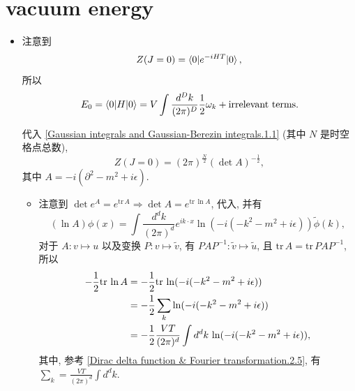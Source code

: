 \section{vacuum energy} \label{free field theory.4}
\begin{itemize}
	\item 注意到
	\begin{equation} \label{free field theory.4.1}
		Z(J = 0) = \braket{0 | e^{- i H T} | 0},
	\end{equation}
	所以
	\begin{equation}
		E_0 = \braket{0 | H | 0} = V \int \frac{d^D k}{(2 \pi)^D} \frac{1}{2} \omega_k + \text{irrelevant terms}.
	\end{equation}
	
	\begin{tcolorbox}[title=calculation:]
		代入 \eqref{Gaussian integrals and Gaussian-Berezin integrals.1.1} (其中 $N$ 是时空格点总数),
		\begin{equation}
			Z(J = 0) = (2 \pi)^{\frac{N}{2}} (\det A)^{- \frac{1}{2}},
		\end{equation}
		其中 $A = - i (\partial^2 - m^2 + i \epsilon)$.
		\begin{itemize}
			\item 注意到 $\det e^A = e^{\mathrm{tr} \, A} \Longrightarrow \det A = e^{\mathrm{tr} \, \ln A}$, 代入, 并有
			\begin{equation}
				(\ln A) \phi(x) = \int \frac{d^d k}{(2 \pi)^d} e^{i k \cdot x} \ln(- i (- k^2 - m^2 + i \epsilon)) \tilde{\phi}(k),
			\end{equation}
			对于 $A : v \mapsto u$ 以及变换 $P : v \mapsto \tilde{v}$, 有 $P A P^{- 1} : \tilde{v} \mapsto \tilde{u}$, 且 $\mathrm{tr} \, A = \mathrm{tr} \, P A P^{- 1}$, 所以
			\begin{align}
				- \frac{1}{2} \mathrm{tr} \, \ln A &= - \frac{1}{2} \mathrm{tr} \, \ln(- i (- k^2 - m^2 + i \epsilon)) \notag \\
				&= - \frac{1}{2} \sum_k \ln(- i (- k^2 - m^2 + i \epsilon)) \notag \\
				&= - \frac{1}{2} \frac{V T}{(2 \pi)^d} \int d^d k \, \ln(- i (- k^2 - m^2 + i \epsilon)),
			\end{align}
			其中, 参考 \eqref{Dirac delta function & Fourier transformation.2.5}, 有 $\sum_k = \frac{V T}{(2 \pi)^d} \int d^d k$.
		\end{itemize}
		

\end{tcolorbox}
\end{itemize}
